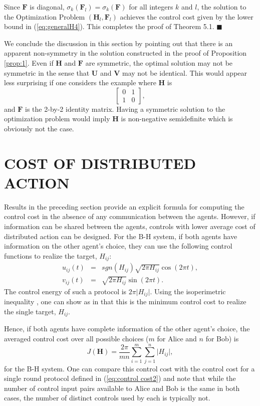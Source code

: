 \documentclass[12pt,onecolumn,draftcls]{IEEEtran}
\newcommand{\bF}{\mathbf{F}}
\begin{document}
Since $\bF$ is diagonal, 
$\sigma_k(\mathbf{F}_{l})=\sigma_k(\mathbf{F})$
for all integers $k$ and $l$,
the solution to the Optimization Problem $(\mathbf{H}_l, \mathbf{F}_{l})$ achieves the control cost given by the lower bound in (\ref{eq:generalH4}).  This completes the proof of Theorem 5.1. 
\hfill $\blacksquare$

We conclude the discussion in this section by pointing out that there is an apparent non-symmetry in the solution constructed in
the proof of Proposition \ref{prop:1}.   Even if $\mathbf{H}$ and $\mathbf{F}$ are symmetric, the optimal solution may not be symmetric
in the sense that $\mathbf{U}$ and $\mathbf{V}$ may not be identical.  This would appear less surprising if one considers
the example where $\mathbf{H}$ is
\begin{equation}
\left[
\begin{array}{cc}
0  &  1  \\
1 &   0
\end{array}
\right],
\end{equation}
and $\mathbf{F}$ is the 2-by-2 identity matrix.  Having a symmetric solution to the optimization problem
would imply $\mathbf{H}$ is non-negative semidefinite which is obviously not the case.  

\section{COST OF DISTRIBUTED ACTION}\setcounter{equation}{0}

Results in the preceding section provide an explicit formula for computing the control cost in the absence of
any communication between the agents.  However, if information can be shared between the agents, controls with lower average cost of distributed action can be designed.   For the B-H system, if both agents have information on the other agent's choice, they can use the following control functions to realize the target, $H_{ij}$:
\begin{eqnarray}
u_{ij}(t) &=& sgn(H_{ij}) \sqrt{2\pi H_{ij}} \cos(2\pi t),\\
v_{ij}(t) &=& \sqrt{2\pi H_{ij}} \sin(2\pi t).
\end{eqnarray}
The control energy of such a protocol is 
$2\pi \vert H_{ij} \vert$.
Using the isoperimetric inequality \cite{Os}, one can show as in \cite{WB} that this is the minimum
control cost to realize the single target, $H_{ij}$.

Hence, if both agents have complete information of the other agent's choice,
the averaged control cost over all possible choices ($m$ for Alice and $n$ for Bob) is
\begin{equation}
J(\mathbf{H})=\frac{2\pi}{mn} \sum_{i=1}^m\sum_{j=1}^n \vert H_{ij} \vert,
\label{eq:J}
\end{equation}
for the B-H system.
One can compare this control cost with the control cost for a single round protocol defined in (\ref{eq:control cost2}) and note
that while the number of control input pairs available to Alice and Bob is the same in both cases, the number of distinct controls used by each is typically not.
\end{document}
